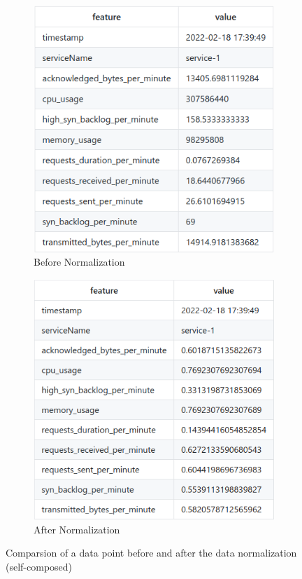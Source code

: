 \begin{figure}[H]
    \centering
    \begin{subfigure}[b]{0.4\textwidth}
        \centering
        \includegraphics[width=\textwidth]{assets/implementation/before-normalization.png}
        \caption{Before Normalization}
        \label{fig:before-normalization}
    \end{subfigure}
    \hfill
    \begin{subfigure}[b]{0.4\textwidth}
        \centering
        \includegraphics[width=\textwidth]{assets/implementation/after-normalization.png}
        \caption{After Normalization}
        \label{fig:after-normalization}
    \end{subfigure}
    \hfill
       \caption{Comparsion of a data point before and after the data normalization (self-composed)}
\end{figure}

